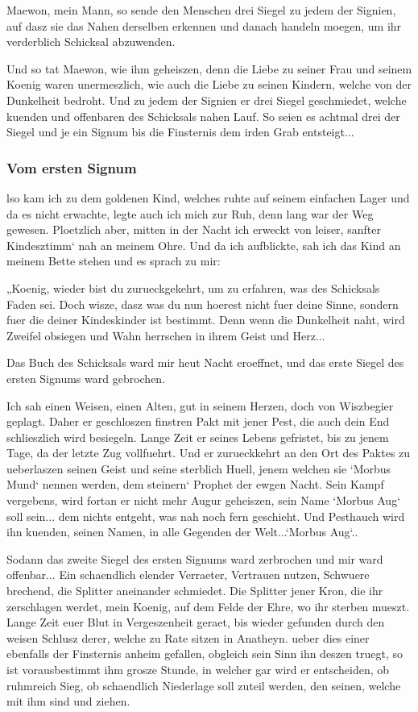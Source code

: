 \documentclass[a5paper,8pt]{book}
\begin{document}
Maewon, mein Mann, so sende den Menschen drei Siegel zu jedem der Signien, auf dasz sie das Nahen derselben erkennen und danach handeln moegen, um ihr verderblich Schicksal abzuwenden.

Und so tat Maewon, wie ihm geheiszen, denn die Liebe zu seiner Frau und seinem Koenig waren unermeszlich, wie auch die Liebe zu seinen Kindern, welche von der Dunkelheit bedroht.
Und zu jedem der Signien er drei Siegel geschmiedet, welche kuenden und offenbaren des Schicksals nahen Lauf. So seien es achtmal drei der Siegel und je ein Signum bis die Finsternis dem irden Grab entsteigt... 

\newpage

\subsubsection{ Vom ersten Signum}

lso kam ich zu dem goldenen Kind, welches ruhte auf seinem einfachen Lager und da es nicht erwachte, legte auch ich mich zur Ruh, denn lang war der Weg gewesen. Ploetzlich aber, mitten in der Nacht ich erweckt von leiser, sanfter Kindesztimm‘ nah an meinem Ohre. Und da ich aufblickte, sah ich das Kind an meinem Bette stehen und es sprach zu mir:

„Koenig, wieder bist du zurueckgekehrt, um zu erfahren, was des Schicksals Faden sei. Doch wisze, dasz was du nun hoerest nicht fuer deine Sinne, sondern fuer die deiner Kindeskinder ist bestimmt. Denn wenn die Dunkelheit naht, wird Zweifel obsiegen und Wahn herrschen in ihrem Geist und Herz...

Das Buch des Schicksals ward mir heut Nacht eroeffnet, und das erste Siegel des ersten Signums ward gebrochen.

Ich sah einen Weisen, einen Alten, gut in seinem Herzen, doch von Wiszbegier geplagt. Daher er geschloszen finstren Pakt mit jener Pest, die auch dein End schlieszlich wird besiegeln. Lange Zeit er seines Lebens gefristet, bis zu jenem Tage, da der letzte Zug vollfuehrt. Und er zurueckkehrt an den Ort des Paktes zu ueberlaszen seinen Geist und seine sterblich Huell, jenem welchen sie ‘Morbus Mund‘ nennen werden, dem steinern‘ Prophet der ewgen Nacht. Sein Kampf vergebens, wird fortan er nicht mehr Augur geheiszen, sein Name ‘Morbus Aug‘ soll sein... dem nichts entgeht, was nah noch fern geschieht. Und Pesthauch wird ihn kuenden, seinen Namen, in alle Gegenden der Welt...‘Morbus Aug‘..

Sodann das zweite Siegel des ersten Signums ward zerbrochen und mir ward offenbar...
Ein schaendlich elender Verraeter, Vertrauen nutzen, Schwuere brechend, die Splitter aneinander schmiedet. Die Splitter jener Kron, die ihr zerschlagen werdet, mein Koenig, auf dem Felde der Ehre, wo ihr sterben mueszt. Lange Zeit euer Blut in Vergeszenheit geraet, bis wieder gefunden durch den weisen Schlusz derer, welche zu Rate sitzen in Anatheyn. ueber dies einer ebenfalls der Finsternis anheim gefallen, obgleich sein Sinn ihn deszen truegt, so ist vorausbestimmt ihm grosze Stunde, in welcher gar wird er entscheiden, ob ruhmreich Sieg, ob schaendlich Niederlage soll zuteil werden, den seinen, welche mit ihm sind und ziehen.
\end{document}
